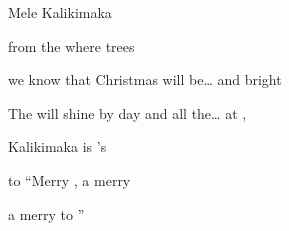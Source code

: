 \begin{SBSong}{Mele Kalikimaka}
\begin{SBVerse}
    from the  where  trees 
    
     we know that Christmas will be\ldots {} and bright 
    
    The  will shine by day and all the\ldots {} at ,
    
     Kalikimaka is 's  
    
    to  ``Merry , a  merry 
    
    a  merry  to ''  
  \end{SBVerse}
 
\end{SBSong}
    
